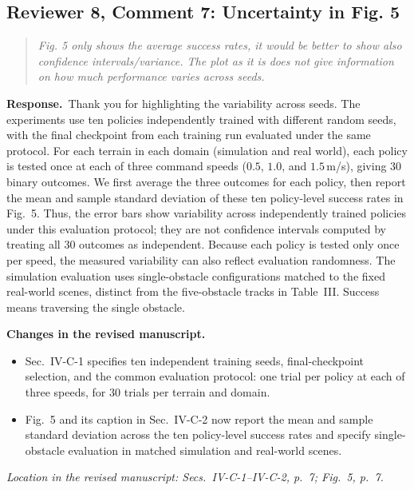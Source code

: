\documentclass[11pt]{article}
\newenvironment{reviewcomment}{\begin{quote}\color{reviewblue}\itshape}{\end{quote}}
\newcommand{\Response}{\par\noindent\textbf{Response.}\ }
\newcommand{\Changes}{\par\noindent\textbf{Changes in the revised manuscript.}\ }
\newcommand{\Location}[1]{\par\noindent\textit{Location in the revised manuscript: #1}}
\begin{document}
\subsection*{Reviewer 8, Comment 7: Uncertainty in Fig. 5}
\begin{reviewcomment}
Fig. 5 only shows the average success rates, it would be better to show also confidence intervals/variance. The plot as it is does not give information on how much performance varies across seeds.
\end{reviewcomment}
\Response Thank you for highlighting the variability across seeds. The experiments use ten policies independently trained with different random seeds, with the final checkpoint from each training run evaluated under the same protocol. For each terrain in each domain (simulation and real world), each policy is tested once at each of three command speeds ($0.5$, $1.0$, and $1.5$\,m/s), giving 30 binary outcomes. We first average the three outcomes for each policy, then report the mean and sample standard deviation of these ten policy-level success rates in Fig.~5. Thus, the error bars show variability across independently trained policies under this evaluation protocol; they are not confidence intervals computed by treating all 30 outcomes as independent. Because each policy is tested only once per speed, the measured variability can also reflect evaluation randomness. The simulation evaluation uses single-obstacle configurations matched to the fixed real-world scenes, distinct from the five-obstacle tracks in Table~III. Success means traversing the single obstacle.
\Changes
\begin{itemize}
    \item Sec.~IV-C-1 specifies ten independent training seeds, final-checkpoint selection, and the common evaluation protocol: one trial per policy at each of three speeds, for 30 trials per terrain and domain.
    \item Fig.~5 and its caption in Sec.~IV-C-2 now report the mean and sample standard deviation across the ten policy-level success rates and specify single-obstacle evaluation in matched simulation and real-world scenes.
\end{itemize}
\Location{Secs.~IV-C-1--IV-C-2, p.~7; Fig.~5, p.~7.}
\end{document}
